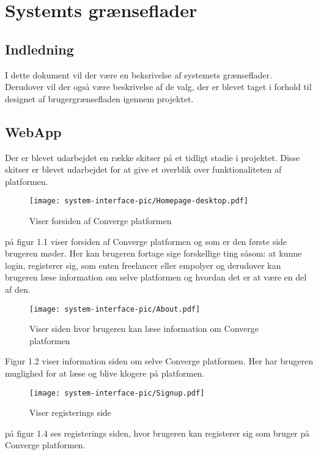 \chapter{Systemts grænseflader}

\section{Indledning}
I dette dokument vil der være en beksrivelse af systemets grænseflader. 
Derudover vil der også være beskrivelse af de valg, der er blevet taget i forhold til designet af brugergrænsefladen igennem projektet. 

\section{WebApp}
Der er blevet udarbejdet en række skitser på et tidligt stadie i projektet. Disse skitser er blevet udarbejdet for at give et overblik over funktionaliteten af platformen.


\begin{figure}[ht]
    \centering
\texttt{[image: system-interface-pic/Homepage-desktop.pdf]}
\caption{Viser forsiden af Converge platformen}
\label{fig:figure2}
\end{figure}

på figur 1.1 viser forsiden af Converge platformen og som er den første side brugeren møder. Her kan brugeren fortage sige forskellige ting såsom: at kunne login, registerer sig, som enten freelancer eller empolyer og derudover kan brugeren læse information om selve platformen og hvordan det er at være en del af den.   
\newpage
\begin{figure}[ht]
    \centering
\texttt{[image: system-interface-pic/About.pdf]}
\caption{Viser siden hvor brugeren kan læse information om Converge platformen}
\label{fig:figure2}
\end{figure}

Figur 1.2 viser information siden om selve Converge platformen. Her har brugeren muglighed for at læse og blive klogere på platformen.

\begin{figure}[ht]
    \centering
\texttt{[image: system-interface-pic/Signup.pdf]}
\caption{Viser registerings side}
\label{fig:figure2}
\end{figure}

på figur 1.4 ses registerings siden, hvor brugeren kan registerer sig som bruger på Converge platformen.



